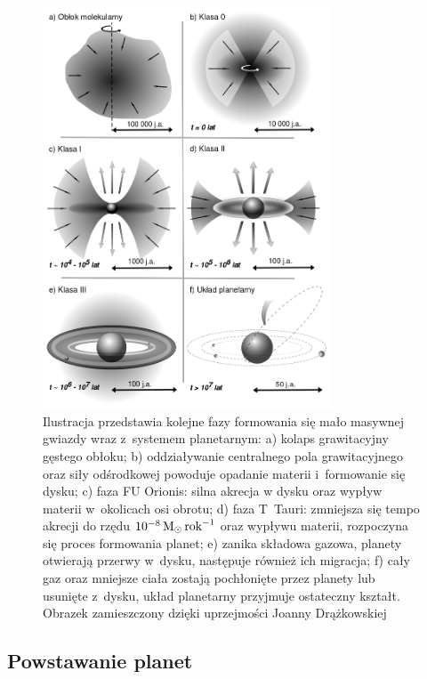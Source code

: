 \begin{figure}[p]
\centering 
\includegraphics[width=0.77\textwidth]{figures/planetformation.png}
\caption[Fazy formowania się mało masywnych gwiazd.]
   {Ilustracja przedstawia kolejne fazy formowania się mało masywnej gwiazdy
   wraz z~systemem planetarnym: a) kolaps grawitacyjny gęstego obłoku; b)
   oddziaływanie centralnego pola grawitacyjnego oraz siły odśrodkowej powoduje
   opadanie materii i~formowanie się dysku; c) faza FU Orionis: silna akrecja w
   dysku oraz wypływ materii w~okolicach osi obrotu; d) faza T~Tauri: zmniejsza
   się tempo akrecji do rzędu $10^{-8}\hbox{$\mathrm{\thinspace M_{\odot}}$}\hbox{$\thinspace\textrm{rok}$}^{-1}$ oraz wypływu materii,
   rozpoczyna się proces formowania planet; e) zanika składowa gazowa, planety
otwierają przerwy w~dysku, następuje również ich migracja; f) cały gaz oraz
mniejsze ciała zostają pochłonięte przez planety lub usunięte z~dysku, układ
planetarny przyjmuje ostateczny kształt. Obrazek zamieszczony dzięki uprzejmości
Joanny Drążkowskiej}

\label{fig:planet}
\end{figure}

\subsection{Powstawanie planet}

